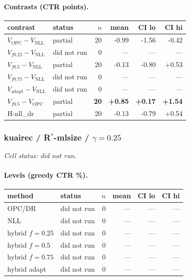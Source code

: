 \documentclass[10pt,a4paper]{article}
\begin{document}
\paragraph{Contrasts (CTR points).}
{\centering\small\begin{tabular}{llrrrr}
\toprule contrast & status & $n$ & mean & CI lo & CI hi \\
\midrule
$V_{\mathrm{OPC}}-V_{\mathrm{NLL}}$ & partial & 20 & -0.99 & -1.56 & -0.42 \\
$V_{f0.25}-V_{\mathrm{NLL}}$ & did not run & 0 & --- & --- & --- \\
$V_{f0.5}-V_{\mathrm{NLL}}$ & partial & 20 & -0.13 & -0.80 & +0.53 \\
$V_{f0.75}-V_{\mathrm{NLL}}$ & did not run & 0 & --- & --- & --- \\
$V_{\mathrm{adapt}}-V_{\mathrm{NLL}}$ & did not run & 0 & --- & --- & --- \\
\textbf{$V_{f0.5}-V_{\mathrm{OPC}}$} & partial & \textbf{20} & \textbf{+0.85} & \textbf{+0.17} & \textbf{+1.54} \\
H-nll\_dr & partial & 20 & -0.13 & -0.79 & +0.54 \\
\bottomrule\end{tabular}\par}
\bigskip
\subsubsection{kuairec / R$^*$-mlsize / $\gamma=0.25$}
\emph{Cell status: did not run}.
\paragraph{Levels (greedy CTR \%).}
{\centering\small\begin{tabular}{llrrrr}
\toprule method & status & $n$ & mean & CI lo & CI hi \\
\midrule
OPC/DR & did not run & 0 & --- & --- & --- \\
NLL & did not run & 0 & --- & --- & --- \\
hybrid $f{=}0.25$ & did not run & 0 & --- & --- & --- \\
hybrid $f{=}0.5$ & did not run & 0 & --- & --- & --- \\
hybrid $f{=}0.75$ & did not run & 0 & --- & --- & --- \\
hybrid adapt & did not run & 0 & --- & --- & --- \\
\bottomrule\end{tabular}\par}
\end{document}
